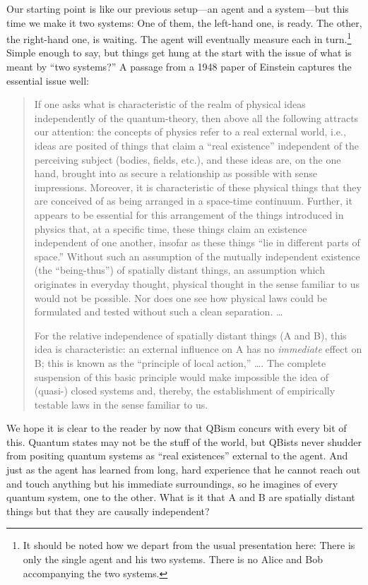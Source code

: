 \documentclass[aps,pra,superscriptaddress,10pt,tightenlines,twocolumn,nofootinbib]{revtex4}
\begin{document}
Our starting point is like our previous setup---an agent and a system---but this time we make it two systems:  One of them, the left-hand one, is ready. The other, the right-hand one, is waiting.  The agent will eventually measure each in turn.\footnote{It should be noted how we depart from the usual presentation here:  There is only the single agent and his two systems.  There is no Alice and Bob accompanying the two systems.}  Simple enough to say, but things get hung at the start with the issue of what is meant by ``two systems?''  A passage from a 1948 paper of Einstein \cite{Einstein48} captures the essential issue well:
\begin{quote}
\noindent If one asks what is characteristic of the realm of physical ideas independently of the quantum-theory, then above all the following attracts our attention: the concepts of physics refer to a real external world, i.e., ideas are posited of things that claim a ``real existence'' independent of the perceiving subject (bodies, fields, etc.), and these ideas are, on the one hand, brought into as secure a relationship as possible with sense impressions. Moreover, it is characteristic of these physical things that they are conceived of as being arranged in a space-time continuum. Further, it appears to be essential for this arrangement of the things introduced in physics that, at a specific time, these things claim an existence independent of one another, insofar as these things ``lie in different parts of space.'' Without such an assumption of the mutually independent existence (the ``being-thus'') of spatially distant things, an assumption which originates in everyday thought, physical thought in the sense familiar
to us would not be possible. Nor does one see how physical laws could be formulated and tested without such a clean separation. \ldots %

For the relative independence of spatially distant things (A and B), this idea is characteristic: an external influence on A has no {\it immediate\/} effect on B; this is known as the ``principle of local action,'' \ldots. %
The complete suspension of this basic principle would make impossible the idea of (quasi-) closed systems and, thereby, the establishment of empirically testable laws in the sense familiar to us.
\end{quote}
We hope it is clear to the reader by now that QBism concurs with every bit of this.  Quantum states may not be the stuff of the world, but QBists never shudder from positing quantum systems as ``real existences'' external to the agent.  And just as the agent has learned from long, hard experience that he cannot reach out and touch anything but his immediate surroundings, so he imagines of every quantum system, one to the other.  What is it that A and B are spatially distant things but that they are causally independent?
\end{document}

